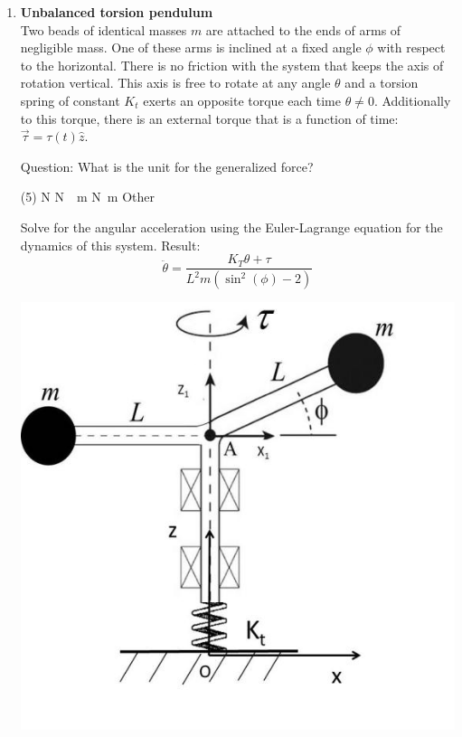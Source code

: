 \documentclass[11pt, a4paper, twoside]{article}
\begin{document}
\begin{enumerate}
\item 
\begin{minipage}[t][5.5cm]{0.6\textwidth}
\textbf{Unbalanced torsion pendulum}\\
Two beads of identical masses $m$ are attached to the ends of arms of negligible mass.
One of these arms is inclined at a fixed angle $\phi$ with respect to the horizontal.
There is no friction with the system that keeps the axis of rotation vertical.
This axis is free to rotate at any angle $\theta$ and a torsion spring of constant $K_t$ exerts an opposite torque each time $\theta \neq 0$.
Additionally to this torque, there is an external torque that is a function of time: $\vec{\tau}= \tau (t) \hat{z}$.

Question:
What is the unit for the generalized force?
\begin{tasks}(5)
	\task \si{\newton}
	\task \si{\newton \over \metre}
	\task \si{\newton \metre}
	\task Other
\end{tasks}
Solve for the angular acceleration using the Euler-Lagrange equation for the dynamics of this system. Result:
\[
	\ddot{\theta} = \frac{K_{T} \theta + \tau}{L^{2} m \left(\sin^{2}{\left(\phi \right)} - 2\right)}
\] 
\end{minipage}
\begin{minipage}[c][1cm][t]{0.35\textwidth}
	\includegraphics[width=\textwidth]{figures/pset7ex2}
\end{minipage}




\end{enumerate}
\end{document}
